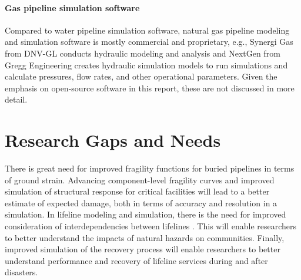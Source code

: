 \paragraph{Gas pipeline simulation software} Compared to water pipeline simulation software, natural gas pipeline modeling and simulation software is mostly commercial and proprietary, e.g., Synergi Gas from DNV-GL conducts hydraulic modeling and analysis and NextGen from Gregg Engineering creates hydraulic simulation models to run simulations and calculate pressures, flow rates, and other operational parameters. Given the emphasis on open-source software in this report, these are not discussed in more detail.

\section{Research Gaps and Needs}
\label{sec:perf_pipeline_gaps}

There is great need for improved fragility functions for buried pipelines in terms of ground strain. Advancing component-level fragility curves and improved simulation of structural response for critical facilities will lead to a better estimate of expected damage, both in terms of accuracy and resolution in a simulation. In lifeline modeling and simulation, there is the need for improved consideration of interdependencies between lifelines \citep{duenas-osorio2007seismic, johansen2018probabilistic}. This will enable researchers to better understand the impacts of natural hazards on communities. Finally, improved simulation of the recovery process \citep{tabucchi2010simulation, he2019disaster, tomar2020hindcasting} will enable researchers to better understand performance and recovery of lifeline services during and after disasters.

